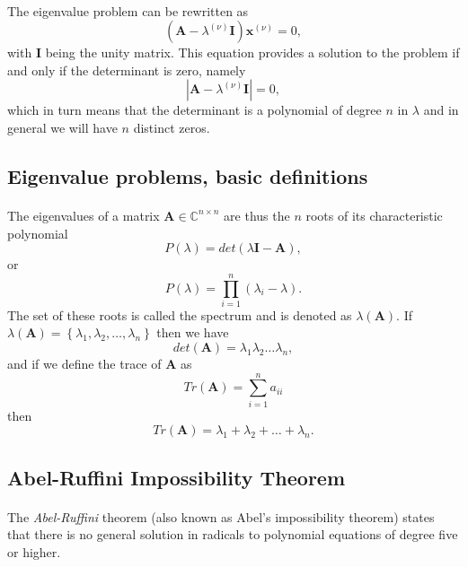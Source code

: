 \documentclass[%
oneside,                 %
final,                   %
10pt]{article}
\begin{document}
\paragraph{}
The eigenvalue problem can be rewritten as 
\[
   \left( \mathbf{A}-\lambda^{(\nu)} \mathbf{I} \right) \mathbf{x}^{(\nu)} = 0,
\]
with $\mathbf{I}$ being the unity matrix. This equation provides
a solution to the problem if and only if the determinant
is zero, namely
\[
   \left| \mathbf{A}-\lambda^{(\nu)}\mathbf{I}\right| = 0,
\]
which in turn means that the determinant is a polynomial
of degree $n$ in $\lambda$ and in general we will have 
$n$ distinct zeros.



\subsection*{Eigenvalue problems, basic definitions}

\paragraph{}
The eigenvalues of a matrix 
$\mathbf{A}\in {\mathbb{C}}^{n\times n}$
are thus the $n$ roots of its characteristic polynomial 
\[
P(\lambda) = det(\lambda\mathbf{I}-\mathbf{A}),
\]
or 
\[
  P(\lambda)= \prod_{i=1}^{n}\left(\lambda_i-\lambda\right).
\]
The set of these roots is called the spectrum and is denoted as
$\lambda(\mathbf{A})$.
If $\lambda(\mathbf{A})=\left\{\lambda_1,\lambda_2,\dots ,\lambda_n\right\}$ then we have
\[
   det(\mathbf{A})= \lambda_1\lambda_2\dots\lambda_n, 
\]
and if we define the trace of $\mathbf{A}$ as
\[
Tr(\mathbf{A})=\sum_{i=1}^n a_{ii}\]
then
\[
Tr(\mathbf{A})=\lambda_1+\lambda_2+\dots+\lambda_n.
\]



\subsection*{Abel-Ruffini Impossibility Theorem}

\paragraph{}
The \emph{Abel-Ruffini} theorem (also known as Abel's impossibility theorem) 
states that there is no general solution in radicals to polynomial equations of degree five or higher.
\end{document}
